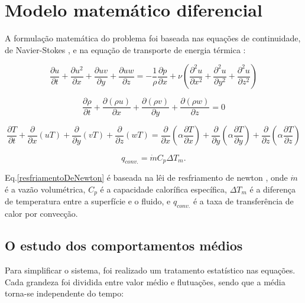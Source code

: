 \section{Modelo matemático diferencial}
A formulação matemática do problema foi baseada nas equações de continuidade, de Navier-Stokes \cite{Cengel}, e na equação de transporte de energia térmica \cite{Incropera}: 

\begin{equation}
  \frac{\partial u}{\partial t} + \frac{\partial u^2}{\partial x} + \frac{\partial uv}{\partial y} + \frac{\partial uw}{\partial z} = - \frac{1}{\rho} \frac{\partial {p}}{\partial x} + \nu \left( \frac{\partial^2 u}{\partial x^2} + \frac{\partial^2 u}{\partial y^2} + \frac{\partial^2 u}{\partial z^2}   \right)
\end{equation}

\begin{equation}
  \frac{\partial \rho}{\partial t} +  \frac{\partial (\rho u)}{\partial x} + \frac{\partial (\rho v)}{\partial y} + \frac{\partial (\rho w)}{\partial z} = 0
\end{equation}

\begin{equation}
  \frac{\partial T}{\partial t} + {\frac{\partial{}}{\partial{x}} (uT)} + {\frac{\partial{}}{\partial{y}} (vT)} + {\frac{\partial{}}{\partial{z}} (wT)}
  =
  {\frac{\partial{}}{\partial{x}}} \left(\alpha {\frac{\partial{T}}{\partial{x}}} \right) +
  {\frac{\partial{}}{\partial{y}}} \left(\alpha {\frac{\partial{T}}{\partial{y}}} \right) +
  {\frac{\partial{}}{\partial{z}}} \left(\alpha {\frac{\partial{T}}{\partial{z}}} \right)
\end{equation}

\begin{equation}\label{resfriamentoDeNewton}
  q_{conv.} = \dot{m} C_p \Delta T_m.
\end{equation}

Eq.\ref{resfriamentoDeNewton} é baseada na lêi de resfriamento de newton \cite{Incropera}, onde $\dot{m}$ é a vazão volumétrica, $C_p$ é a capacidade calorífica específica, $\Delta T_m$ é a diferença de temperatura entre a superfície e o fluido, e $q_{conv.}$ é a taxa de transferência de calor por convecção.

\subsection{O estudo dos comportamentos médios}
Para simplificar o sistema, foi realizado um tratamento estatístico nas equações. Cada grandeza foi dividida entre valor médio e flutuações, sendo que a média torna-se independente do tempo:

